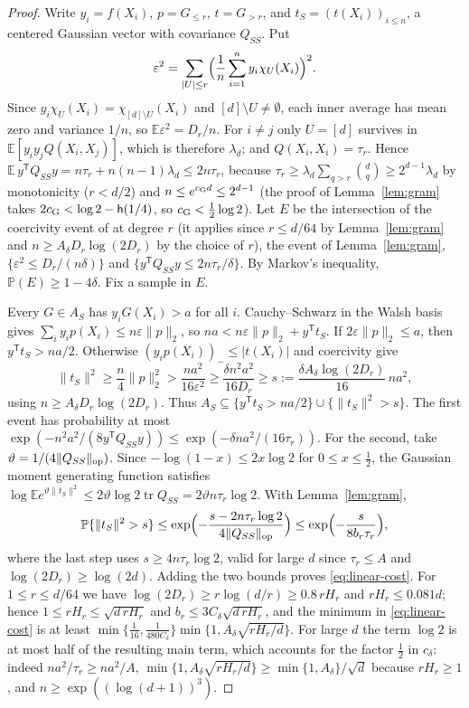 \documentclass[11pt]{article}
\theoremstyle{definition}\newtheorem{assumption}[theorem]{Assumption}
\theoremstyle{remark}\newtheorem{remark}[theorem]{Remark}
\newcommand{\E}{\mathbb E}
\newcommand{\Pp}{\mathbb P}
\begin{document}
\begin{proof}
Write $y_i=f(X_i)$, $p=G_{\le r}$, $t=G_{>r}$, and $t_S=(t(X_i))_{i\le n}$,
a centered Gaussian vector with covariance $Q_{SS}$. Put
\[
 \varepsilon^2=\sum_{|U|\le r}\Bigl(\frac1n\sum_{i=1}^ny_i\chi_U(X_i)\Bigr)^2 .
\]
Since $y_i\chi_U(X_i)=\chi_{[d]\setminus U}(X_i)$ and
$[d]\setminus U\ne\emptyset$, each inner average has mean zero and variance
$1/n$, so $\E\varepsilon^2=D_r/n$. For $i\ne j$ only $U=[d]$ survives in
$\E[y_iy_jQ(X_i,X_j)]$, which is therefore $\lambda_d$; and
$Q(X_i,X_i)=\tau_r$. Hence
$\E\,y^{\mathsf T}Q_{SS}y=n\tau_r+n(n-1)\lambda_d\le2n\tau_r$, because
$\tau_r\ge\lambda_d\sum_{q>r}\binom dq\ge2^{d-1}\lambda_d$ by monotonicity
($r<d/2$) and $n\le e^{c_{\rm G}d}\le2^{d-1}$ (the proof of
Lemma~\ref{lem:gram} takes $2c_{\rm G}<\log2-\mathsf h(1/4)$, so
$c_{\rm G}<\frac12\log2$). Let $E$ be the intersection of the coercivity
event of \cite[Lemma~4.4]{subcritical} at degree $r$ (it applies since
$r\le d/64$ by Lemma~\ref{lem:gram} and $n\ge A_\delta D_r\log(2D_r)$ by the
choice of $r$), the event of Lemma~\ref{lem:gram},
$\{\varepsilon^2\le D_r/(n\delta)\}$ and
$\{y^{\mathsf T}Q_{SS}y\le2n\tau_r/\delta\}$. By Markov's inequality,
$\Pp(E)\ge1-4\delta$. Fix a sample in $E$.

Every $G\in A_S$ has $y_iG(X_i)>a$ for all $i$. Cauchy--Schwarz in the Walsh
basis gives $\sum_iy_ip(X_i)\le n\varepsilon\|p\|_2$, so
$na<n\varepsilon\|p\|_2+y^{\mathsf T}t_S$. If $2\varepsilon\|p\|_2\le a$,
then $y^{\mathsf T}t_S>na/2$. Otherwise $(y_ip(X_i))_-\le|t(X_i)|$ and
coercivity give
\[
 \|t_S\|^2\ge\frac n4\|p\|_2^2>\frac{na^2}{16\varepsilon^2}
 \ge\frac{\delta n^2a^2}{16D_r}\ge s:=\frac{\delta A_\delta\log(2D_r)}{16}\,na^2,
\]
using $n\ge A_\delta D_r\log(2D_r)$. Thus
$A_S\subseteq\{y^{\mathsf T}t_S>na/2\}\cup\{\|t_S\|^2>s\}$. The first event
has probability at most
$\exp(-n^2a^2/(8y^{\mathsf T}Q_{SS}y))\le\exp(-\delta na^2/(16\tau_r))$. For
the second, take $\vartheta=1/(4\|Q_{SS}\|_{\rm op})$. Since
$-\log(1-x)\le2x\log2$ for $0\le x\le\frac12$, the Gaussian moment
generating function satisfies
$\log\E e^{\vartheta\|t_S\|^2}\le2\vartheta\log2\operatorname{tr}Q_{SS}
=2\vartheta n\tau_r\log2$. With Lemma~\ref{lem:gram},
\[
 \Pp\{\|t_S\|^2>s\}\le\exp\Bigl(-\frac{s-2n\tau_r\log2}
 {4\|Q_{SS}\|_{\rm op}}\Bigr)\le\exp\Bigl(-\frac{s}{8b_r\tau_r}\Bigr),
\]
where the last step uses $s\ge4n\tau_r\log2$, valid for large $d$ since
$\tau_r\le A$ and $\log(2D_r)\ge\log(2d)$. Adding the two bounds proves
\eqref{eq:linear-cost}. For $1\le r\le d/64$ we have
$\log(2D_r)\ge r\log(d/r)\ge0.8\,rH_r$ and $rH_r\le0.081d$; hence
$1\le rH_r\le\sqrt{d\,rH_r}$ and $b_r\le3C_\delta\sqrt{d\,rH_r}$, and the
minimum in \eqref{eq:linear-cost} is at least
$\min\{\frac1{16},\frac1{480C_\delta}\}\min\{1,A_\delta\sqrt{rH_r/d}\}$.
For large $d$ the term $\log2$ is at most half of the resulting main term,
which accounts for the factor $\frac12$ in $c_\delta$: indeed
$na^2/\tau_r\ge na^2/A$, $\min\{1,A_\delta\sqrt{rH_r/d}\}\ge
\min\{1,A_\delta\}/\sqrt d$ because $rH_r\ge1$, and
$n\ge\exp((\log(d+1))^3)$.


\end{proof}
\end{document}

